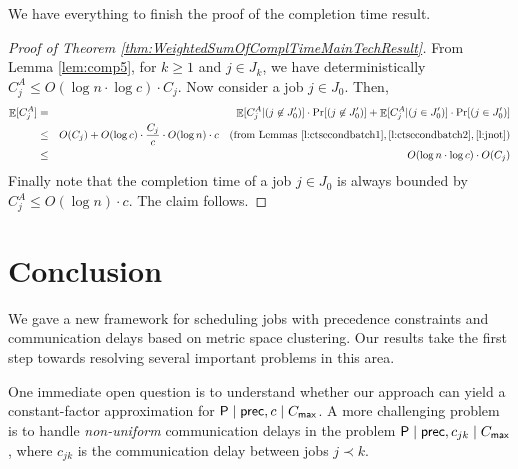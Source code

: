 We have everything to finish the proof of the completion time result.

\begin{proof}[ Proof of Theorem \ref{thm:WeightedSumOfComplTimeMainTechResult}]
From Lemma \ref{lem:comp5}, for $k \geq 1$ and  $ j \in J_k$,  we have deterministically $C^{A}_j \leq O(\log n \cdot \log c) \cdot C_j$.
Now consider a job $j \in J_0$. Then,
\begin{eqnarray*}
\mathop{\mathbb{E}}[C^A_j]  &=& \mathop{\mathbb{E}}[C^A_j | (j \not \in J'_0)] \cdot \text{Pr}[ (j \not \in J'_0)] + \mathop{\mathbb{E}}[C^A_j | (j  \in J'_0)] \cdot \text{Pr}[ (j \in J'_0)]  \\
&\leq& O(C_j) + O(\log c) \cdot \frac{C_j}{c}  \cdot O(\log n) \cdot c \quad (\text{from Lemmas } \ref{l:ctsecondbatch1}, \ref{l:ctsecondbatch2}, \ref{l:jnot} ) \\
&\leq& O(\log n \cdot \log c) \cdot O(C_j)
\end{eqnarray*}
Finally note that the completion time of a job $j \in J_0$ is always bounded by $C_j^A \leq O(\log n) \cdot c$. The claim follows.
\end{proof}


\section*{Conclusion}
We gave a new framework for scheduling jobs with precedence constraints and communication delays based on metric space clustering.
Our results take the first step towards resolving several important problems in this area. 

One immediate open question is to understand whether our approach can yield a constant-factor approximation for $\mathsf{P} \mid \mathsf{prec}, c \mid C_{\mathsf{max}}$.
A more challenging problem is to handle {\em non-uniform} communication delays in 
the problem $\mathsf{P} \mid \mathsf{prec}, c_{jk} \mid C_{\mathsf{max}}$, where $c_{jk}$ is the communication delay between jobs $j \prec k$.







\newpage
